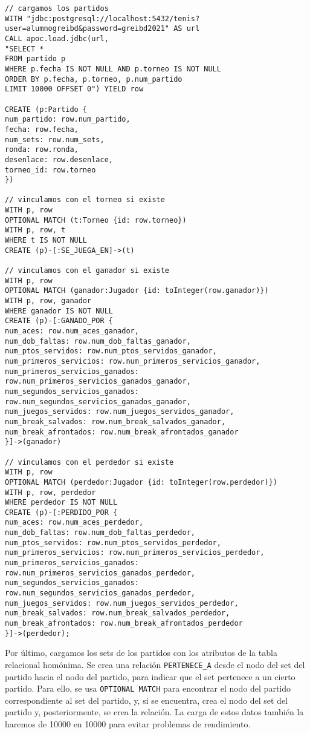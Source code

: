 \begin{lstlisting}[language=Cypher]
// cargamos los partidos
WITH "jdbc:postgresql://localhost:5432/tenis?user=alumnogreibd&password=greibd2021" AS url
CALL apoc.load.jdbc(url,
"SELECT *
FROM partido p
WHERE p.fecha IS NOT NULL AND p.torneo IS NOT NULL
ORDER BY p.fecha, p.torneo, p.num_partido
LIMIT 10000 OFFSET 0") YIELD row

CREATE (p:Partido {
num_partido: row.num_partido,
fecha: row.fecha,
num_sets: row.num_sets,
ronda: row.ronda,
desenlace: row.desenlace,
torneo_id: row.torneo 
})

// vinculamos con el torneo si existe
WITH p, row
OPTIONAL MATCH (t:Torneo {id: row.torneo})
WITH p, row, t
WHERE t IS NOT NULL
CREATE (p)-[:SE_JUEGA_EN]->(t)

// vinculamos con el ganador si existe
WITH p, row
OPTIONAL MATCH (ganador:Jugador {id: toInteger(row.ganador)})
WITH p, row, ganador
WHERE ganador IS NOT NULL
CREATE (p)-[:GANADO_POR {
num_aces: row.num_aces_ganador,
num_dob_faltas: row.num_dob_faltas_ganador,
num_ptos_servidos: row.num_ptos_servidos_ganador,
num_primeros_servicios: row.num_primeros_servicios_ganador,
num_primeros_servicios_ganados: row.num_primeros_servicios_ganados_ganador,
num_segundos_servicios_ganados: row.num_segundos_servicios_ganados_ganador,
num_juegos_servidos: row.num_juegos_servidos_ganador,
num_break_salvados: row.num_break_salvados_ganador,
num_break_afrontados: row.num_break_afrontados_ganador
}]->(ganador)

// vinculamos con el perdedor si existe
WITH p, row
OPTIONAL MATCH (perdedor:Jugador {id: toInteger(row.perdedor)})
WITH p, row, perdedor
WHERE perdedor IS NOT NULL
CREATE (p)-[:PERDIDO_POR {
num_aces: row.num_aces_perdedor,
num_dob_faltas: row.num_dob_faltas_perdedor,
num_ptos_servidos: row.num_ptos_servidos_perdedor,
num_primeros_servicios: row.num_primeros_servicios_perdedor,
num_primeros_servicios_ganados: row.num_primeros_servicios_ganados_perdedor,
num_segundos_servicios_ganados: row.num_segundos_servicios_ganados_perdedor,
num_juegos_servidos: row.num_juegos_servidos_perdedor,
num_break_salvados: row.num_break_salvados_perdedor,
num_break_afrontados: row.num_break_afrontados_perdedor
}]->(perdedor);
\end{lstlisting}

Por último, cargamos los sets de los partidos con los atributos de la tabla relacional homónima. Se crea una relación \texttt{PERTENECE\_A} desde el nodo del set del partido hacia el nodo del partido, para indicar que el set pertenece a un cierto partido. Para ello, se usa \texttt{OPTIONAL MATCH} para encontrar el nodo del partido correspondiente al set del partido, y, si se encuentra, crea el nodo del set del partido y, posteriormente, se crea la relación. La carga de estos datos también la haremos de 10000 en 10000 para evitar problemas de rendimiento.


